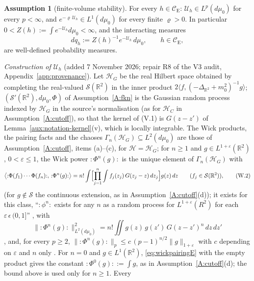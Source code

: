 \documentclass[11pt,a4paper]{article}
\theoremstyle{plain}
\theoremstyle{definition}
\newtheorem{assumption}{Assumption}
\theoremstyle{plain}
\theoremstyle{definition}
\newcommand{\R}{\mathbb{R}}
\newcommand{\CE}{\mathcal{C}_{\mathrm E}}
\newcommand{\HH}{\mathcal{H}}
\newcommand{\ip}[2]{\langle #1,#2\rangle}
\begin{document}
\begin{assumption}[finite-volume stability]\label{A:stability}
For every $h\in\CE$: $\mathcal U_h\in L^p(d\mu_0)$ for every $p<\infty$, and
$e^{-\varrho\,\mathcal U_h}\in L^1(d\mu_0)$ for every finite $\varrho>0$. In particular
$0<Z(h):=\int e^{-\mathcal U_h}d\mu_0<\infty$, and the interacting measures
\[
 dq_h:=Z(h)^{-1}e^{-\mathcal U_h}\,d\mu_0 ,\qquad h\in\CE ,
\]
are well-defined probability measures.

\emph{Construction of $\mathcal U_h$} (added 7 November 2026; repair R8 of the V3 audit,
Appendix~\ref{app:provenance}).  Let $\HH_G$ be the real Hilbert space obtained by
completing the real-valued $\mathcal S(\R^2)$ in the inner product
$2\ip f{(-\Delta_{\R^2}+m_0^2)^{-1}g}$; $(\mathcal S'(\R^2),d\mu_0,\Phi)$ of
Assumption~\ref{A:fkn} is the Gaussian random process indexed by $\HH_G$ in the source's
normalisation (as for $\HH_C$ in Assumption~\ref{A:cutoff}), so that the kernel of (V.1) is
$G(z-z')$ of Lemma~\ref{aux:notation-kernel}(v), which is locally integrable.  The
Wick products, the pairing facts and the chaoses $\Gamma_n(\HH_G)\subseteq L^2(d\mu_0)$ are
those of Assumption~\ref{A:cutoff}, items (a)--(c), for $\HH=\HH_G$; for $n\ge1$ and $g\in
L^{1+\varepsilon}(\R^2)$, $0<\varepsilon\le1$, the Wick power ${:}\Phi^n(g){:}$ is the
unique element of $\Gamma_n(\HH_G)$ with
\begin{equation}
 \bigl\langle{:}\Phi(f_1)\cdots\Phi(f_n){:},\,{:}\Phi^n(g){:}\bigr\rangle
 =n!\int\Bigl[\prod_{j=1}^n\int f_j(z_j)\,G(z_j-z)\,dz_j\Bigr]g(z)\,dz
 \qquad(f_j\in\mathcal S(\R^2)),
 \tag{W.2}\label{eq:wickpairingE}
\end{equation}
\cite[(V.3), p.~136]{SimonBook} (for $g\notin\mathcal S$ the continuous extension, as in
Assumption~\ref{A:cutoff}(d)); it exists for this class, ``${:}\phi^n{:}$ exists for any
$n$ as a random process for $L^{1+\varepsilon}(R^2)$ for each $\varepsilon\,\epsilon\,(0,1]$''
\cite[Thm.~V.2(a), p.~137]{SimonBook}, with
\begin{equation}
 \|{:}\Phi^n(g){:}\|_{L^2(d\mu_0)}^2=n!\iint g(z)\,g(z')\,G(z-z')^n\,dz\,dz'
 \tag{W.3}\label{eq:wickisometry}
\end{equation}
\cite[p.~137]{SimonBook}, and, for every $p\ge2$, $\|{:}\Phi^n(g){:}\|_p\le
c\,(p-1)^{n/2}\|g\|_{1+\varepsilon}$ with $c$ depending on $\varepsilon$ and $n$ only
\cite[(V.6a), p.~137; Remark~1, p.~138]{SimonBook}.  For $n=0$ and $g\in L^1(\R^2)$,
\eqref{eq:wickpairingE} with the empty product gives the constant ${:}\Phi^0(g){:}:=\int g$,
as in Assumption~\ref{A:cutoff}(d); the bound above is used only for $n\ge1$.  Every

\end{assumption}
\end{document}
